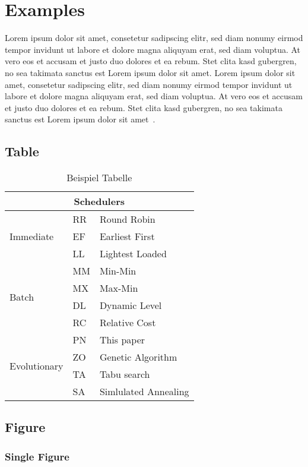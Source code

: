 \section{Examples}
\label{sec:examples}

Lorem ipsum dolor sit amet, consetetur sadipscing elitr, sed diam nonumy eirmod tempor invidunt ut labore et dolore magna aliquyam erat, sed diam voluptua. At vero eos et accusam et justo duo dolores et ea rebum. Stet clita kasd gubergren, no sea takimata sanctus est Lorem ipsum dolor sit amet. Lorem ipsum dolor sit amet, consetetur sadipscing elitr, sed diam nonumy eirmod tempor invidunt ut labore et dolore magna aliquyam erat, sed diam voluptua. At vero eos et accusam et justo duo dolores et ea rebum. Stet clita kasd gubergren, no sea takimata sanctus est Lorem ipsum dolor sit amet~\cite{example}.

\subsection{Table}
\label{subsec:table}

\begin{table}[htb!]
\centering
\begin{tabular}{|l|l|l|} \hline
\multicolumn{3}{|c|}{Schedulers} \\ \hline
\multirow{3}{*}{Immediate} & RR & Round Robin \\
& EF & Earliest First \\
& LL & Lightest Loaded \\ \hline
\multirow{4}{*}{Batch} & MM & Min-Min \\ 
& MX & Max-Min \\
& DL & Dynamic Level \\ 
& RC & Relative Cost \\ \hline
\multirow{4}{*}{Evolutionary} & PN & This paper \\
& ZO & Genetic Algorithm\\
& TA & Tabu search\\
& SA & Simlulated Annealing \\ \hline
\end{tabular} \caption{Beispiel Tabelle}
\end{table}\label{tab:table}

\subsection{Figure}
\label{subsec:figure}

\subsubsection{Single Figure}
\label{subsubsec:single_figure}

